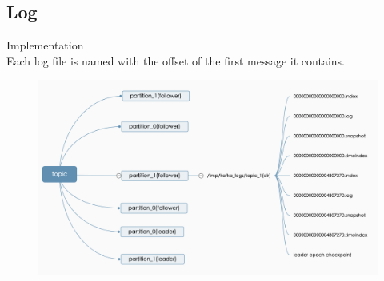 \subsection{Log}
\begin{frame}[plain,t]{Implementation} %
     \\
    \vspace{2ex}
     Each log file is named with the offset of the first message it contains.
    \begin{figure}
        \centering
        \includegraphics[width=0.9\linewidth]{image/0305}
        \label{fig:0305}
    \end{figure}
    
    
    
\end{frame}

